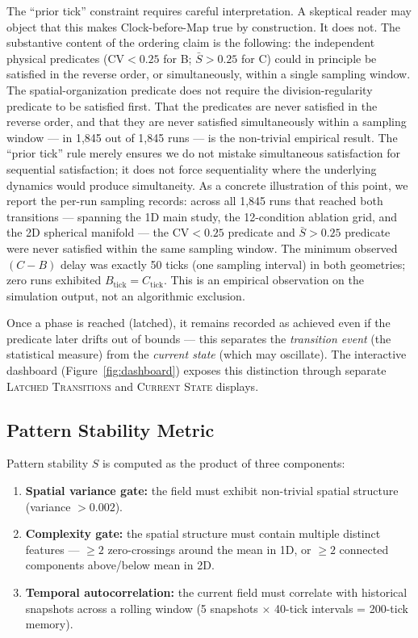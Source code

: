 \documentclass[11pt,letterpaper]{article}
\begin{document}
The ``prior tick'' constraint requires careful interpretation. A skeptical reader may object that this makes Clock-before-Map true by construction. It does not. The substantive content of the ordering claim is the following: the independent physical predicates ($\mathrm{CV} < 0.25$ for B; $\bar{S} > 0.25$ for C) could in principle be satisfied in the reverse order, or simultaneously, within a single sampling window. The spatial-organization predicate does not require the division-regularity predicate to be satisfied first. That the predicates are never satisfied in the reverse order, and that they are never satisfied simultaneously within a sampling window --- in 1{,}845 out of 1{,}845 runs --- is the non-trivial empirical result. The ``prior tick'' rule merely ensures we do not mistake simultaneous satisfaction for sequential satisfaction; it does not force sequentiality where the underlying dynamics would produce simultaneity. As a concrete illustration of this point, we report the per-run sampling records: across all 1{,}845 runs that reached both transitions --- spanning the 1D main study, the 12-condition ablation grid, and the 2D spherical manifold --- the $\mathrm{CV} < 0.25$ predicate and $\bar{S} > 0.25$ predicate were never satisfied within the same sampling window. The minimum observed $(C - B)$ delay was exactly 50 ticks (one sampling interval) in both geometries; zero runs exhibited $B_{\mathrm{tick}} = C_{\mathrm{tick}}$. This is an empirical observation on the simulation output, not an algorithmic exclusion.

Once a phase is reached (latched), it remains recorded as achieved even if the predicate later drifts out of bounds --- this separates the \emph{transition event} (the statistical measure) from the \emph{current state} (which may oscillate). The interactive dashboard (Figure~\ref{fig:dashboard}) exposes this distinction through separate \textsc{Latched Transitions} and \textsc{Current State} displays.

\subsection{Pattern Stability Metric}

Pattern stability $S$ is computed as the product of three components:
\begin{enumerate}
  \item \textbf{Spatial variance gate:} the field must exhibit non-trivial spatial structure (variance $> 0.002$).
  \item \textbf{Complexity gate:} the spatial structure must contain multiple distinct features --- $\geq 2$ zero-crossings around the mean in 1D, or $\geq 2$ connected components above/below mean in 2D.
  \item \textbf{Temporal autocorrelation:} the current field must correlate with historical snapshots across a rolling window (5 snapshots $\times$ 40-tick intervals = 200-tick memory).
\end{enumerate}
\end{document}

